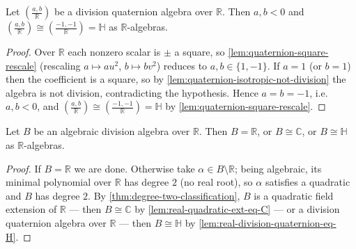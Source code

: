 \begin{lemma}
    \label{lem:real-division-quaternion-eq-H}
    Let $\left(\frac{a,b}{\mathbb{R}}\right)$ be a division quaternion algebra over
    $\mathbb{R}$. Then $a, b < 0$ and $\left(\frac{a,b}{\mathbb{R}}\right) \cong
    \left(\frac{-1,-1}{\mathbb{R}}\right) = \mathbb{H}$ as $\mathbb{R}$-algebras.
\end{lemma}
\begin{proof}
    Over $\mathbb{R}$ each nonzero scalar is $\pm$ a square, so
    \ref{lem:quaternion-square-rescale} (rescaling $a \mapsto a u^2$, $b \mapsto b
    v^2$) reduces to $a, b \in \{1, -1\}$. If $a = 1$ (or $b = 1$) then the
    coefficient is a square, so by \ref{lem:quaternion-isotropic-not-division} the
    algebra is not division, contradicting the hypothesis. Hence $a = b = -1$, i.e.
    $a, b < 0$, and $\left(\frac{a,b}{\mathbb{R}}\right) \cong
    \left(\frac{-1,-1}{\mathbb{R}}\right) = \mathbb{H}$ by
    \ref{lem:quaternion-square-rescale}.
\end{proof}

\begin{corollary}[Frobenius]
    \label{cor:frobenius}
    Let $B$ be an algebraic division algebra over $\mathbb{R}$. Then
    $B = \mathbb{R}$, or $B \cong \mathbb{C}$, or $B \cong \mathbb{H}$ as
    $\mathbb{R}$-algebras.
\end{corollary}
\begin{proof}
    If $B = \mathbb{R}$ we are done. Otherwise take $\alpha \in B \setminus
    \mathbb{R}$; being algebraic, its minimal polynomial over $\mathbb{R}$ has
    degree $2$ (no real root), so $\alpha$ satisfies a quadratic and $B$ has degree
    $2$. By \ref{thm:degree-two-classification}, $B$ is a quadratic field extension
    of $\mathbb{R}$ --- then $B \cong \mathbb{C}$ by
    \ref{lem:real-quadratic-ext-eq-C} --- or a division quaternion algebra over
    $\mathbb{R}$ --- then $B \cong \mathbb{H}$ by
    \ref{lem:real-division-quaternion-eq-H}.
\end{proof}


